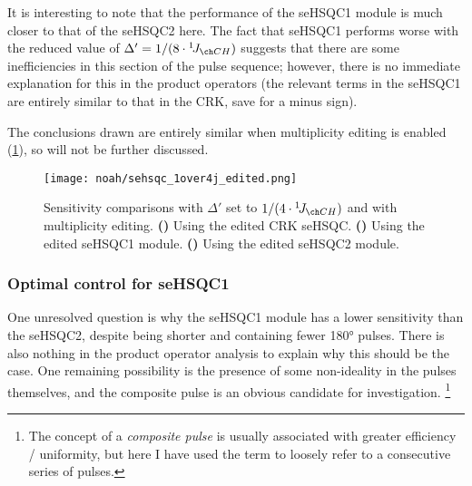 It is interesting to note that the performance of the seHSQC1 module is much closer to that of the seHSQC2 here.
The fact that seHSQC1 performs worse with the reduced value of $\Delta' = 1 / (8 \cdot \oneJ{CH})$ suggests that there are some inefficiencies in this section of the pulse sequence; however, there is no immediate explanation for this in the product operators (the relevant terms in the seHSQC1 are entirely similar to that in the CRK, save for a minus sign).

The conclusions drawn are entirely similar when multiplicity editing is enabled (\cref{fig:noah_sehsqc_1over4j_edited}), so will not be further discussed.

\begin{figure}[!ht]
    \centering
    \texttt{[image: noah/sehsqc\_1over4j\_edited.png]}%
    {\label{fig:noah_sehsqc_1over4j_edited_crk}}%
    {\label{fig:noah_sehsqc_1over4j_edited_1}}%
    {\label{fig:noah_sehsqc_1over4j_edited_2}}%
    \caption[Sensitivity comparisons for edited seHSQC with $\Delta' = 1 / (4 \cdot \oneJ{CH})$]{
        Sensitivity comparisons with $\Delta'$ set to $1 / (4 \cdot \oneJ{CH})$ and with multiplicity editing.
        \textbf{()} Using the edited CRK seHSQC.
        \textbf{()} Using the edited seHSQC1 module.
        \textbf{()} Using the edited seHSQC2 module.
    }
    \label{fig:noah_sehsqc_1over4j_edited}
\end{figure}




\subsubsection{Optimal control for seHSQC1}

One unresolved question is why the seHSQC1 module has a lower sensitivity than the seHSQC2, despite being shorter and containing fewer \ang{180} pulses.
There is also nothing in the product operator analysis to explain why this should be the case.
One remaining possibility is the presence of some non-ideality in the pulses themselves, and the composite \proton{} pulse is an obvious candidate for investigation.%
\footnote{The concept of a \textit{composite pulse}\autocite{Levitt1986PNMRS} is usually associated with greater efficiency / uniformity, but here I have used the term to loosely refer to a consecutive series of pulses.}

